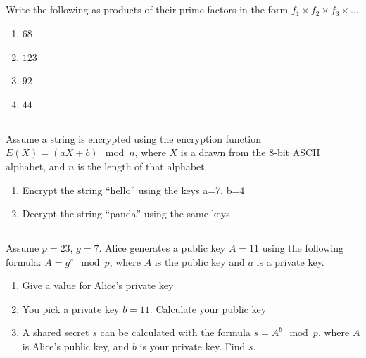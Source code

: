\documentclass[twocolumn]{article}
\begin{document}
\subsection{}

    Write the following as products of their prime factors in the form $ f_1 \times f_2 \times f_3 \times \dots $

    \begin{multicols}{2}
        \begin{enumerate}
            \item $68$
            \item $123$
            \item $92$
            \item $44$
        \end{enumerate}
    \end{multicols}

\subsection{}

    Assume a string is encrypted using the encryption function $E(X) = (aX + b) \mod n$, where $X$ is a drawn from the 8-bit ASCII alphabet, and $n$ is the length of that alphabet.

    \begin{enumerate}
        \item Encrypt the string “hello” using the keys a=7, b=4
        \item Decrypt the string “panda” using the same keys
    \end{enumerate}

\subsection{}

    Assume $p = 23$, $g = 7$. Alice generates a public key $A = 11$ using the following formula: $A = g^a \mod p$, where $A$ is the public key and $a$ is a private key.

    \begin{enumerate}
        \item Give a value for Alice’s private key
        \item You pick a private key $b = 11$. Calculate your public key
        \item A shared secret $s$ can be calculated with the formula $s = A^b \mod p$, where $A$ is Alice’s public key, and $b$ is your private key. Find $s$.
    \end{enumerate}
\end{document}

